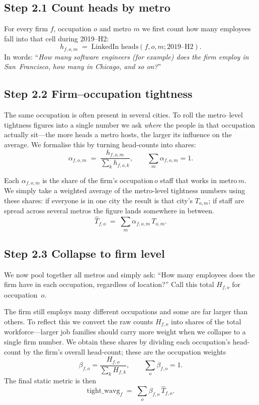 \documentclass[11pt]{article}
\begin{document}
\subsection*{Step 2.1\; Count heads by metro}
For every firm $f$, occupation $o$ and metro $m$ we first count how many
employees fall into that cell during 2019--H2:
\[
  h_{f,o,m} \;=\; \text{LinkedIn heads}(f, o, m; 2019\text{--H2}).
\]
In words: “\emph{How many software engineers (for example) does the firm
employ in San~Francisco, how many in Chicago, and so on?}”

\subsection*{Step 2.2\; Firm–occupation tightness}
The same occupation is often present in several cities.  To roll the
metro–level tightness figures into a single number we ask \emph{where}
the people in that occupation actually sit—the more heads a metro hosts,
the larger its influence on the average.  We formalise this by turning
head-counts into shares:
\[
  \alpha_{f,o,m} \;=\; \frac{h_{f,o,m}}{\sum_k h_{f,o,k}}, \qquad
  \sum_m \alpha_{f,o,m}=1.
\]

Each $\alpha_{f,o,m}$ is the share of the firm’s occupation\,$o$ staff
that works in metro\,$m$.  We simply take a weighted average of the
metro-level tightness numbers using these shares: if everyone is in one
city the result is that city’s $T_{o,m}$; if staff are spread across
several metros the figure lands somewhere in between.
\[
  \widehat T_{f,o}\;=\;\sum_m \alpha_{f,o,m}\,T_{o,m}. \tag{A1}
\]

\subsection*{Step 2.3\; Collapse to firm level}
We now pool together all metros and simply ask: 
“How many employees does the firm have in each occupation, regardless of location?”
Call this total $H_{f,o}$ for occupation~$o$.

The firm still employs many different occupations and some are far
larger than others.  To reflect this we convert the raw counts
$H_{f,o}$ into shares of the total workforce—larger job families should
carry more weight when we collapse to a single firm number.  We obtain
these shares by dividing each occupation’s head-count by the firm’s
overall head-count; these are the occupation weights
\[
  \beta_{f,o}=\frac{H_{f,o}}{\sum_k H_{f,k}}, \qquad \textstyle\sum_o \beta_{f,o}=1.
\]
The final static metric is then
\[
  \boxed{\text{tight\_wavg}_f\;=\;\sum_o \beta_{f,o}\,\widehat T_{f,o}.} \tag{A2}
\]
\end{document}
